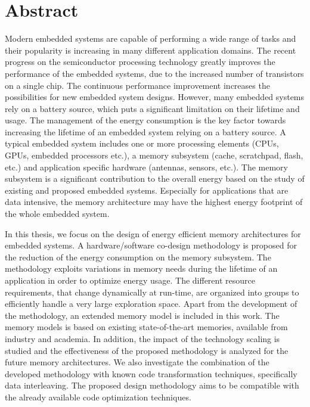 \vspace*{\fill}
\section*{\hspace*{\fill} Abstract \hspace*{\fill}}

Modern embedded systems are capable of performing a wide range of tasks and their popularity is increasing in many different application domains.
The recent progress on the semiconductor processing technology greatly improves the performance of the embedded systems, due to the increased number of transistors on a single chip.
The continuous performance improvement increases the possibilities for new embedded system designs.
However, many embedded systems rely on a battery source, which puts a significant limitation on their lifetime and usage.
The management of the energy consumption is the key factor towards increasing the lifetime of an embedded system relying on a battery source.
A typical embedded system includes one or more processing elements (CPUs, GPUs, embedded processors etc.), a memory subsystem (cache, scratchpad, flash, etc.) and application specific hardware (antennas, sensors, etc.). 
The memory subsystem is a significant contribution to the overall energy based on the study of existing and proposed embedded systems.
Especially for applications that are data intensive, the memory architecture may have the highest energy footprint of the whole embedded system.

In this thesis, we focus on the design of energy efficient memory architectures for embedded systems.
A hardware/software co-design methodology is proposed for the reduction of the energy consumption on the memory subsystem. 
The  methodology exploits variations in memory needs during the lifetime of an application in order to optimize energy usage. 
The different resource requirements, that change dynamically at run-time, are organized into groups to efficiently handle a very large exploration space.
Apart from the development of the methodology, an extended memory model is included in this work. 
The memory models is based on existing state-of-the-art memories, available from industry and academia.
In addition, the impact of the technology scaling is studied and the effectiveness of the proposed methodology is analyzed for the future memory architectures.
We also investigate the combination of the developed methodology with known code transformation techniques, specifically data interleaving.
The proposed design methodology aims to be compatible with the already available code optimization techniques.
\vspace*{\fill}
\afterpage{\null\newpage}
\newpage


